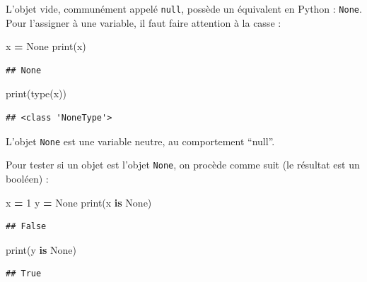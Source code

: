 \documentclass[
  12pt,
]{book}
\newenvironment{Shaded}{\begin{snugshade}}{\end{snugshade}}
\newcommand{\BuiltInTok}[1]{#1}
\newcommand{\DecValTok}[1]{\textcolor[rgb]{0.00,0.00,0.81}{#1}}
\newcommand{\KeywordTok}[1]{\textcolor[rgb]{0.13,0.29,0.53}{\textbf{#1}}}
\newcommand{\NormalTok}[1]{#1}
\newcommand{\OperatorTok}[1]{\textcolor[rgb]{0.81,0.36,0.00}{\textbf{#1}}}
\newcommand{\VariableTok}[1]{\textcolor[rgb]{0.00,0.00,0.00}{#1}}
\numberwithin{equation}{section}
\numberwithin{countremarque}{section}
\begin{document}
L'objet vide, communément appelé \texttt{null}, possède un équivalent en Python : \texttt{None}. Pour l'assigner à une variable, il faut faire attention à la casse :

\begin{Shaded}
\begin{Highlighting}[]
\NormalTok{x }\OperatorTok{=} \VariableTok{None}
\BuiltInTok{print}\NormalTok{(x)}
\end{Highlighting}
\end{Shaded}

\begin{lstlisting}
## None
\end{lstlisting}

\begin{Shaded}
\begin{Highlighting}[]
\BuiltInTok{print}\NormalTok{(}\BuiltInTok{type}\NormalTok{(x))}
\end{Highlighting}
\end{Shaded}

\begin{lstlisting}
## <class 'NoneType'>
\end{lstlisting}

L'objet \texttt{None} est une variable neutre, au comportement ``null''.

Pour tester si un objet est l'objet \texttt{None}, on procède comme suit (le résultat est un booléen) :

\begin{Shaded}
\begin{Highlighting}[]
\NormalTok{x }\OperatorTok{=} \DecValTok{1}
\NormalTok{y }\OperatorTok{=} \VariableTok{None}
\BuiltInTok{print}\NormalTok{(x }\KeywordTok{is} \VariableTok{None}\NormalTok{)}
\end{Highlighting}
\end{Shaded}

\begin{lstlisting}
## False
\end{lstlisting}

\begin{Shaded}
\begin{Highlighting}[]
\BuiltInTok{print}\NormalTok{(y }\KeywordTok{is} \VariableTok{None}\NormalTok{)}
\end{Highlighting}
\end{Shaded}

\begin{lstlisting}
## True
\end{lstlisting}
\end{document}
